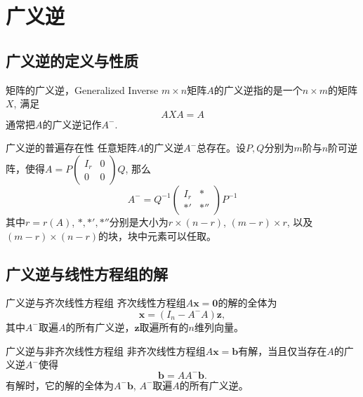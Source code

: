 
\section{广义逆}


\subsection{广义逆的定义与性质}


\begin{frame}

\begin{block}{矩阵的广义逆，Generalized Inverse}
$m\times n$矩阵$A$的广义逆指的是一个$n\times m$的矩阵$X$, 满足
$$AXA = A$$
通常把$A$的广义逆记作$A^-$.
\end{block}

\pause

\begin{block}{广义逆的普遍存在性}
任意矩阵$A$的广义逆$A^-$总存在。设$P,Q$分别为$m$阶与$n$阶可逆阵，使得$A = P \begin{pmatrix} I_r & 0 \\ 0 & 0 \end{pmatrix} Q$, 那么
$$A^- = Q^{-1} \begin{pmatrix} I_r & * \\ *' & *'' \end{pmatrix} P^{-1}$$
其中$r = r(A)$, $*,*',*''$分别是大小为$r \times (n-r)$, $(m-r) \times r$, 以及$(m-r) \times (n-r)$的块，块中元素可以任取。
\end{block}

\end{frame}


\subsection{广义逆与线性方程组的解}


\begin{frame}

\begin{block}{广义逆与齐次线性方程组}
齐次线性方程组$A\mathbf{x} = \mathbf{0}$的解的全体为
$$\mathbf{x} = (I_n - A^-A)\mathbf{z},$$
其中$A^-$取遍$A$的所有广义逆，$\mathbf{z}$取遍所有的$n$维列向量。
\end{block}

\pause

\begin{block}{广义逆与非齐次线性方程组}
非齐次线性方程组$A\mathbf{x} = \mathbf{b}$有解，当且仅当存在$A$的广义逆$A^-$使得
$$\mathbf{b} = A A^- \mathbf{b}.$$
有解时，它的解的全体为$A^-\mathbf{b}$, $A^-$取遍$A$的所有广义逆。
\end{block}

\end{frame}

